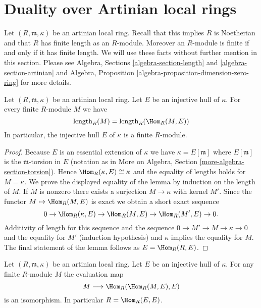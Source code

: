 \section{Duality over Artinian local rings}
\label{section-artinian}

\noindent
Let $(R, \mathfrak m, \kappa)$ be an artinian local ring.
Recall that this implies $R$ is Noetherian and that $R$ has finite
length as an $R$-module. Moreover an $R$-module is finite if and
only if it has finite length. We will use these facts without
further mention in this section. Please see
Algebra, Sections \ref{algebra-section-length} and
\ref{algebra-section-artinian}
and
Algebra, Proposition \ref{algebra-proposition-dimension-zero-ring}
for more details.

\begin{lemma}
\label{lemma-finite}
Let $(R, \mathfrak m, \kappa)$ be an artinian local ring.
Let $E$ be an injective hull of $\kappa$. For every finite
$R$-module $M$ we have
$$
\text{length}_R(M) = \text{length}_R(\Hom_R(M, E))
$$
In particular, the injective hull $E$ of $\kappa$ is a finite $R$-module.
\end{lemma}

\begin{proof}
Because $E$ is an essential extension of $\kappa$ we have
$\kappa = E[\mathfrak m]$ where $E[\mathfrak m]$ is the
$\mathfrak m$-torsion in $E$ (notation as in More on Algebra, Section
\ref{more-algebra-section-torsion}).
Hence $\Hom_R(\kappa, E) \cong \kappa$ and the equality of lengths
holds for $M = \kappa$. We prove the displayed equality of the lemma
by induction on the length of $M$. If $M$ is nonzero there exists a surjection
$M \to \kappa$ with kernel $M'$. Since the functor $M \mapsto \Hom_R(M, E)$
is exact we obtain a short exact sequence
$$
0 \to \Hom_R(\kappa, E) \to \Hom_R(M, E) \to \Hom_R(M', E) \to 0.
$$
Additivity of length for this sequence and the sequence
$0 \to M' \to M \to \kappa \to 0$ and the equality for $M'$ (induction
hypothesis) and $\kappa$ implies the equality for $M$.
The final statement of the lemma follows as $E = \Hom_R(R, E)$.
\end{proof}

\begin{lemma}
\label{lemma-evaluate}
Let $(R, \mathfrak m, \kappa)$ be an artinian local ring.
Let $E$ be an injective hull of $\kappa$.
For any finite $R$-module $M$ the evaluation map
$$
M \longrightarrow \Hom_R(\Hom_R(M, E), E)
$$
is an isomorphism. In particular $R = \Hom_R(E, E)$.
\end{lemma}

